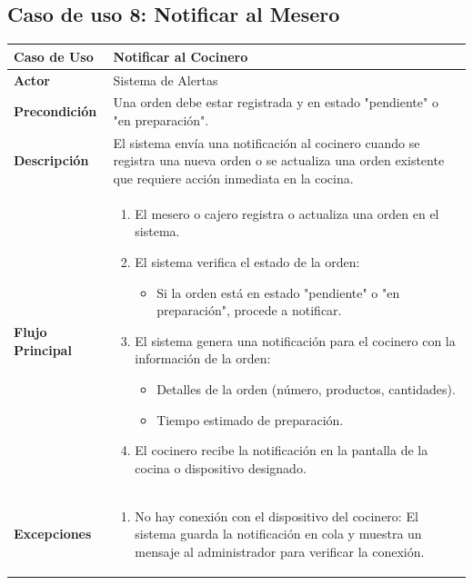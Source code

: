 \documentclass{article}
\begin{document}

\subsection{Caso de uso 8: Notificar al Mesero}

\begin{table}[H]
    \centering
    \begin{tabular}{|p{4cm}|p{11cm}|}
    \hline
    \textbf{Caso de Uso}        & \textbf{Notificar al Cocinero} \\ \hline
    \textbf{Actor}              & Sistema de Alertas \\ \hline
    \textbf{Precondición}       & Una orden debe estar registrada y en estado "pendiente" o "en preparación". \\ \hline
    \textbf{Descripción}        & El sistema envía una notificación al cocinero cuando se registra una nueva orden o se actualiza una orden existente que requiere acción inmediata en la cocina. \\ \hline
    \textbf{Flujo Principal}    & 
    \begin{enumerate}
        \item El mesero o cajero registra o actualiza una orden en el sistema.
        \item El sistema verifica el estado de la orden:
        \begin{itemize}
            \item Si la orden está en estado "pendiente" o "en preparación", procede a notificar.
        \end{itemize}
        \item El sistema genera una notificación para el cocinero con la información de la orden:
        \begin{itemize}
            \item Detalles de la orden (número, productos, cantidades).
            \item Tiempo estimado de preparación.
        \end{itemize}
        \item El cocinero recibe la notificación en la pantalla de la cocina o dispositivo designado.
    \end{enumerate} \\ \hline
    \textbf{Excepciones}        & 
    \begin{enumerate}
        \item No hay conexión con el dispositivo del cocinero: El sistema guarda la notificación en cola y muestra un mensaje al administrador para verificar la conexión.

\end{enumerate}
\end{tabular}
\end{table}
\end{document}
